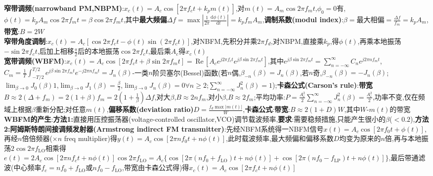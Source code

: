 \documentclass[UTF8,a4paper,10pt]{article}
\providecommand{\abs}[1]{\left\lvert#1\right\rvert}
\providecommand{\re}{\,\text{Re}\,}
\begin{document}
\begin{multicols}{2}
    \textbf{窄带调频(narrowband PM,NBPM)}:$x_c(t)=A_c\cos[2\pi f_ct+k_pm(t)]$,对$m(t)=A_m\cos 2\pi f_mt$,$\phi_0=0$有,$\phi(t)=k_pA_m\cos 2\pi f_mt=\beta\cos 2\pi f_mt$,其中\textbf{最大频偏}$\Delta f=\max\abs{\frac{1}{2\pi}\frac{\mathrm{d}\phi(t)}{\mathrm{d}t}}=k_pf_mA_m$,\textbf{调制系数(modul index)}:$\beta=\text{最大相偏}=\frac{\Delta f}{f_m}=k_pA_m$,\textbf{带宽}:$B=2W$\\
    \textbf{窄带角度调制}:$x_c(t)=A_c[\cos 2\pi f_ct-\phi(t)\sin(2\pi f_ct)]$,对NBFM,先积分并乘$2\pi f_d$,对NBPM,直接乘$k_p$,得$\phi(t)$,再乘本地振荡$-\sin 2\pi f_ct$,后加上相移$\frac{\pi}{2}$后的本地振荡$\cos 2\pi f_ct$,最后乘$A_c$得$x_c(t)$\\
    \textbf{宽带调频(WBFM)}:$x_c(t)=A_c\cos[2\pi f_ct+\beta\sin 2\pi f_mt]=\re[A_ce^{j2\pi f_ct}e^{j\beta\sin 2\pi f_mt}]$,其中$e^{j\beta\sin 2\pi f_mt}=\sum_{n=-\infty}^{\infty}C_ne^{j2\pi nf_mt}$,$C_m=\frac{1}{T}\int_{-T/2}^{T/2}e^{j\beta\sin 2\pi f_mt}e^{-j2\pi nf_mt}=J_n(\beta)$-一类$n$阶贝塞尔(Bessel)函数(若$n$偶,$\beta_{-n}(\beta)=J_n(\beta)$,若$n$奇,$\beta_{-n}(\beta)=-J_n(\beta)$;$\lim_{\beta\rightarrow 0}J_0(\beta)1$,$\lim_{\beta\rightarrow 0}J_1(\beta)=\frac{\beta}{2}$,$\lim_{\beta\rightarrow 0}J_n(\beta)=0\forall n\geq 2$;$\sum_{n=-\infty}^{\infty}J_n^2(\beta)=1$);\textbf{卡森公式(Carson's rule)}:\textbf{带宽}$B\approx 2(\Delta +f_m)=2(1+\beta)f_m=2(1+\frac{1}{\beta})\Delta f$,对大$\beta$,$B\approx 2nf_m$,对小$\beta$,$B\approx 2f_m$;平均功率:$P=\frac{A_c^2}{2}\sum_{n=-\infty}^{\infty}J_n^2(\beta)=\frac{A_c^2}{2}$,功率不变,仅在频域上根据$\beta$重新分配;对任意$m(t)$,\textbf{偏移系数(deviation ratio)}$D=\frac{f_d\max\abs{m(t)}}{W}$,\textbf{卡森公式}:\textbf{带宽}:$B\approx 2(1+D)W$,其中$W$-$m(t)$的带宽\\
    \textbf{WBFM的产生}:\textbf{方法1:}直接用压控振荡器(voltage-controlled oscillator,VCO)调节载波频率,\textbf{要求}:需要稳频措施,只能产生很小的$\beta$($<0.2$),\textbf{方法2:阿姆斯特朗间接调频发射器(Armstrong indirect FM transmitter)}:先经NBFM系统得一NBFM信号$x(t)=A_c\cos[2\pi f_0t+\phi(t)]$,再经$n$倍倍频器($\times n$ freq multiplier)得$y(t)=A_c\cos[2\pi nf_0t+n\phi(t)]$,此时载波频率,最大频偏和偏移系数$D$均变为原来的$n$倍,再与本地振荡$2\cos 2\pi f_{\text{LO}}$相乘得$e(t)=2A_c\cos[2\pi nf_ct+n\phi(t)]\cos 2\pi f_{\text{LO}}=A_c\{\cos[2\pi(nf_0+f_{\text{LO}})t+n\phi(t)]+\cos[2\pi(nf_0-f_{\text{LP}})t+n\phi(t)]\}$,最后带通滤波(中心频率$f_c=nf_0+f_{\text{LO}}$或$nf_0-f_{\text{LO}}$,带宽由卡森公式得)得$x_c(t)=A_c\cos[2\pi f_ct+n\phi(t)]$\\

\end{multicols}
\end{document}
